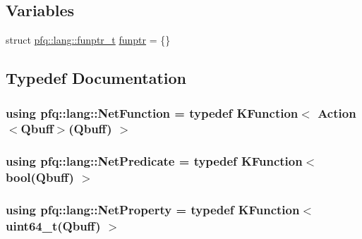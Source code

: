 \subsection*{Variables}
\begin{DoxyCompactItemize}
\item 
struct \hyperlink{structpfq_1_1lang_1_1funptr__t}{pfq\+::lang\+::funptr\+\_\+t} \hyperlink{namespacepfq_1_1lang_a8d957b8f6df7198413d3ff9bd698e682}{funptr} = \{\}
\end{DoxyCompactItemize}


\subsection{Typedef Documentation}
\subsubsection[{\texorpdfstring{Net\+Function}{NetFunction}}]{\setlength{\rightskip}{0pt plus 5cm}using {\bf pfq\+::lang\+::\+Net\+Function} = typedef {\bf K\+Function}$<$ {\bf Action}$<${\bf Qbuff}$>$({\bf Qbuff}) $>$}\hypertarget{namespacepfq_1_1lang_aa68bcd4318570ab85efa3d1aa4c997eb}{}\label{namespacepfq_1_1lang_aa68bcd4318570ab85efa3d1aa4c997eb}
\subsubsection[{\texorpdfstring{Net\+Predicate}{NetPredicate}}]{\setlength{\rightskip}{0pt plus 5cm}using {\bf pfq\+::lang\+::\+Net\+Predicate} = typedef {\bf K\+Function}$<$ bool({\bf Qbuff}) $>$}\hypertarget{namespacepfq_1_1lang_a81905bab0f0cbcdb83d62b840af6943e}{}\label{namespacepfq_1_1lang_a81905bab0f0cbcdb83d62b840af6943e}
\subsubsection[{\texorpdfstring{Net\+Property}{NetProperty}}]{\setlength{\rightskip}{0pt plus 5cm}using {\bf pfq\+::lang\+::\+Net\+Property} = typedef {\bf K\+Function}$<$ uint64\+\_\+t({\bf Qbuff}) $>$}\hypertarget{namespacepfq_1_1lang_a0c784c3d4623b8b9fd1d8fd8f67a4854}{}\label{namespacepfq_1_1lang_a0c784c3d4623b8b9fd1d8fd8f67a4854}


